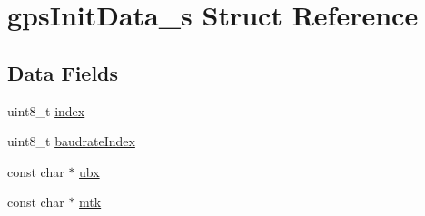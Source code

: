 \hypertarget{structgpsInitData__s}{\section{gps\+Init\+Data\+\_\+s Struct Reference}
\label{structgpsInitData__s}
}
\subsection*{Data Fields}
\begin{DoxyCompactItemize}
\item 
uint8\+\_\+t \hyperlink{structgpsInitData__s_a1e2c6d0efb6ee89815fd9bd8cc500820}{index}
\item 
uint8\+\_\+t \hyperlink{structgpsInitData__s_ac2e584cfb772b72fa113262cecc719a9}{baudrate\+Index}
\item 
const char $\ast$ \hyperlink{structgpsInitData__s_a7b6ee64b437363a14bd0e93d41962f7e}{ubx}
\item 
const char $\ast$ \hyperlink{structgpsInitData__s_a2db8f89dd128d262d4d8b9f69926cf95}{mtk}
\end{DoxyCompactItemize}


